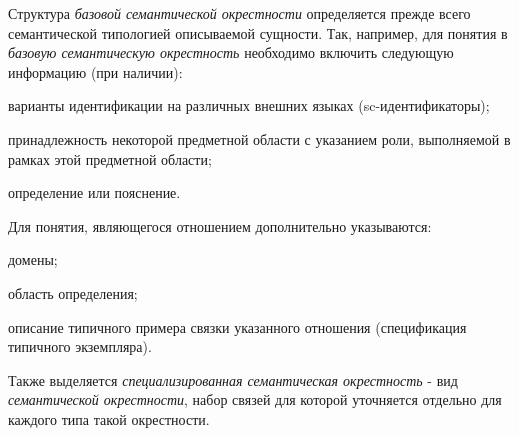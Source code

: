 \bigskip
Структура \textit{базовой семантической окрестности} определяется прежде всего семантической типологией описываемой сущности. Так, например, для понятия в \textit{базовую семантическую окрестность} необходимо включить следующую  информацию (при наличии):
\begin{textitemize}
	\item {варианты идентификации на различных внешних языках (sc-идентификаторы)};
	\item {принадлежность некоторой предметной области с указанием роли, выполняемой в рамках этой предметной области};
	\item{определение или пояснение}.	
\end{textitemize}

Для понятия, являющегося отношением дополнительно указываются:
\begin{textitemize}	
	\item {домены};
	\item {область определения};
	\item {описание типичного примера связки указанного отношения (спецификация типичного экземпляра)}.
\end{textitemize}

Также выделяется \textit{специализированная семантическая окрестность} - вид \textit{семантической окрестности}, набор связей для которой уточняется отдельно для каждого типа такой окрестности.

